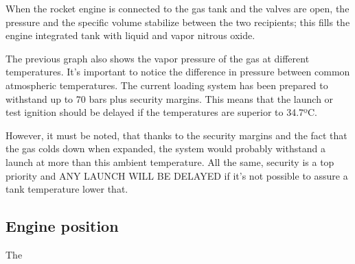When the rocket engine is connected to the gas tank and the valves are open, the pressure and the specific volume stabilize between the two recipients; this fills the engine integrated tank with liquid and vapor nitrous oxide.

The previous graph also shows the vapor pressure of the gas at different temperatures. It's important to notice the difference in pressure between common atmospheric temperatures. The current loading system has been prepared to withstand up to 70 bars plus security margins. This means that the launch or test ignition should be delayed if the temperatures are superior to 34.7ºC.

However, it must be noted, that thanks to the security margins and the fact that the gas colds down when expanded, the system would probably withstand a launch at more than this ambient temperature. All the same, security is a top priority and ANY LAUNCH WILL BE DELAYED if it's not possible to assure a tank temperature lower that.

\subsection*{Engine position}

The 